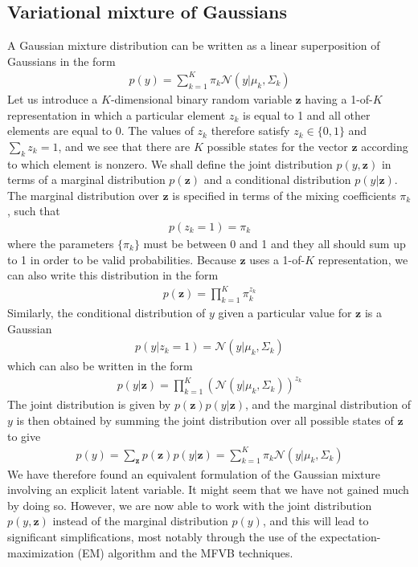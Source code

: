 \documentclass[10pt ]{article}
\begin{document}
\subsection{Variational mixture of Gaussians}
A Gaussian mixture distribution can be written as a linear superposition of Gaussians in the form
\begin{align}
p( y )= \sum_{k=1}^K \pi_k \mathcal{N} (y | \mu_k, \Sigma_k)
\label{eq_mog_def}
\end{align}
Let us introduce a $K$-dimensional binary random variable $\mathbf{z}$ having a 1-of-$K$ representation in which a particular element $z_k$ is equal to 1 and all other elements are equal to 0. The values of $z_k$ therefore satisfy $z_k \in \{0, 1\}$ and $ \sum_k z_k = 1$, and we see that there are $K$ possible states for the vector $\mathbf{z}$ according to which element is nonzero. We shall define the joint distribution $p(y, \mathbf{z})$ in terms of a marginal distribution $p(\mathbf{z})$ and a conditional distribution $p(y|\mathbf{z})$. The marginal distribution over $\mathbf{z}$ is specified in terms of the mixing coefficients $\pi_k$, such that
\begin{align}
p(z_k = 1 ) = \pi_k
\label{eq_mog_def_z}
\end{align}
where the parameters $\{\pi_k\}$ must be between 0 and 1 and they all should sum up to 1 in order to be valid probabilities. Because $\mathbf{z}$ uses a 1-of-$K$ representation, we can also write this distribution in the form
\begin{align}
p ( \mathbf{z}) = \prod_{k=1}^K \pi_k^{z_k}
\label{eq_mog_dist_z}
\end{align}
Similarly, the conditional distribution of $y$ given a particular value for $\mathbf{z}$ is a Gaussian
\begin{align}
p (y | z_k =1 ) = \mathcal{N}(y | \mu_k, \Sigma_k)
\label{eq_mog_dist_y_cond_z}
\end{align}
which can also be written in the form
\begin{align}
p (y | \mathbf{z}) =\prod_{k=1}^K \left( \mathcal{N}(y | \mu_k, \Sigma_k) \right)^{z_k}
\label{eq_mog_dist_y_cond_z_all}
\end{align}
The joint distribution is given by $p(\mathbf{z})p(y|\mathbf{z})$, and the marginal distribution of $y$ is then obtained by summing the joint distribution over all possible states of $\mathbf{z}$ to give
\begin{align}
p( y )= \sum_{\mathbf{z}}  p(\mathbf{z})p(y|\mathbf{z})= \sum_{k=1}^K \pi_k \mathcal{N} (y | \mu_k, \Sigma_k)
\label{eq_mog_marginal_def}
\end{align}
We have therefore found an equivalent formulation of the Gaussian mixture involving an explicit latent variable. It might seem that we have not gained much by doing so. However, we are now able to work with the joint distribution $p(y, \mathbf{z})$ instead of the marginal distribution $p(y)$, and this will lead to significant simplifications, most notably through the use of the expectation-maximization (EM) algorithm and the MFVB techniques. 
\end{document}
